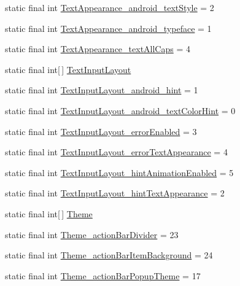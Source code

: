 \begin{DoxyCompactItemize}
\item 
static final int \hyperlink{classcheck_1_1test_1_1_r_1_1styleable_a322f409bd5e2d20b43b0f42b53151ebf}{Text\+Appearance\+\_\+android\+\_\+text\+Style} = 2
\item 
static final int \hyperlink{classcheck_1_1test_1_1_r_1_1styleable_a084a3e7bc2b4a8412125c1fcc233b116}{Text\+Appearance\+\_\+android\+\_\+typeface} = 1
\item 
static final int \hyperlink{classcheck_1_1test_1_1_r_1_1styleable_a5d5337464a97b9d29c16fc4176a319e7}{Text\+Appearance\+\_\+text\+All\+Caps} = 4
\item 
static final int\mbox{[}$\,$\mbox{]} \hyperlink{classcheck_1_1test_1_1_r_1_1styleable_a56e445e43589d92521fa1b8fd6e2e470}{Text\+Input\+Layout}
\item 
static final int \hyperlink{classcheck_1_1test_1_1_r_1_1styleable_ad6a5cba28470d2e39b5a58db528e9851}{Text\+Input\+Layout\+\_\+android\+\_\+hint} = 1
\item 
static final int \hyperlink{classcheck_1_1test_1_1_r_1_1styleable_acec272e290ec4a23a75d437f8712b96a}{Text\+Input\+Layout\+\_\+android\+\_\+text\+Color\+Hint} = 0
\item 
static final int \hyperlink{classcheck_1_1test_1_1_r_1_1styleable_a61fd0cbc829c3fa93cc7a808bc58231e}{Text\+Input\+Layout\+\_\+error\+Enabled} = 3
\item 
static final int \hyperlink{classcheck_1_1test_1_1_r_1_1styleable_af1730eaed5795cdf53e63a5527d2d006}{Text\+Input\+Layout\+\_\+error\+Text\+Appearance} = 4
\item 
static final int \hyperlink{classcheck_1_1test_1_1_r_1_1styleable_a8faed29d074a302a57bd6d80e27ad39a}{Text\+Input\+Layout\+\_\+hint\+Animation\+Enabled} = 5
\item 
static final int \hyperlink{classcheck_1_1test_1_1_r_1_1styleable_a9604a717bdd44907e80a794e886f45cb}{Text\+Input\+Layout\+\_\+hint\+Text\+Appearance} = 2
\item 
static final int\mbox{[}$\,$\mbox{]} \hyperlink{classcheck_1_1test_1_1_r_1_1styleable_acca726d02016a0cf607782ec3a436a81}{Theme}
\item 
static final int \hyperlink{classcheck_1_1test_1_1_r_1_1styleable_a24a4a7345478079d2842c3c6b948cee8}{Theme\+\_\+action\+Bar\+Divider} = 23
\item 
static final int \hyperlink{classcheck_1_1test_1_1_r_1_1styleable_a0452c18018a280bc2c98c290c760c4de}{Theme\+\_\+action\+Bar\+Item\+Background} = 24
\item 
static final int \hyperlink{classcheck_1_1test_1_1_r_1_1styleable_a73283effe9ac39eb90c34200c9d71c48}{Theme\+\_\+action\+Bar\+Popup\+Theme} = 17

\end{DoxyCompactItemize}
